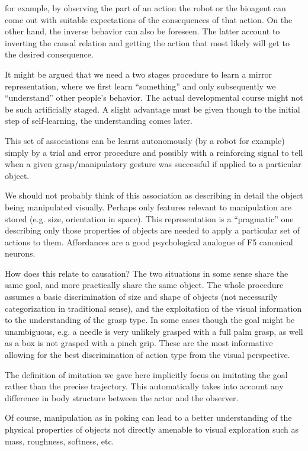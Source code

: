 for example, by observing the part of an action the robot or the
bioagent can come out with suitable expectations of the consequences
of that action. On the other hand, the inverse behavior can also be
foreseen. The latter account to inverting the causal relation and
getting the action that most likely will get to the desired
consequence.

It might be argued that we need a two stages procedure to learn a
mirror representation, where we first learn ``something'' and only
subsequently we ``understand'' other people's behavior. The actual
developmental course might not be such artificially staged. A slight
advantage must be given though to the initial step of self-learning,
the understanding comes later.


This set of associations can be learnt autonomously (by a robot for
example) simply by a trial and error procedure and possibly with a
reinforcing signal to tell when a given grasp/manipulatory gesture was
successful if applied to a particular object.

We should not probably think of this association as describing in
detail the object being manipulated visually. Perhaps only features
relevant to manipulation are stored (e.g. size, orientation in space).
This representation is a ``pragmatic'' one describing only those
properties of objects are needed to apply a particular set of actions
to them. Affordances are a good psychological analogue of F5
canonical neurons.
\fi


\ifverbose
How does this relate to causation?  The two situations in some sense
share the same goal, and more practically share the same object.  The
whole procedure assumes a basic discrimination of size and shape of
objects (not necessarily categorization in traditional sense), and the
exploitation of the visual information to the understanding of the
grasp type. In some cases though the goal might be unambiguous, e.g. a
needle is very unlikely grasped with a full palm grasp, as well as a
box is not grasped with a pinch grip. These are the most informative
allowing for the best discrimination of action type from the visual
perspective.
\fi

\ifverbose
The definition of imitation we gave here implicitly focus on imitating
the goal rather than the precise trajectory. This automatically takes
into account any difference in body structure between the actor and
the observer.

Of course, manipulation as in poking can lead to a better
understanding of the physical properties of objects not directly
amenable to visual exploration such as mass, roughness, softness, etc.
\fi

